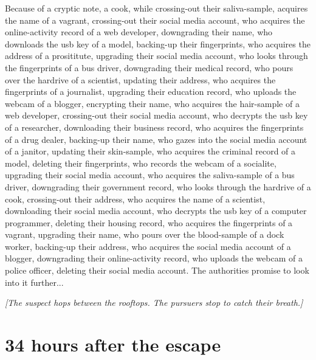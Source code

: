 \documentclass{report}
\begin{document}
Because of a cryptic note, a cook, while crossing-out their saliva-sample, acquires the name of a vagrant, crossing-out their social media account, who acquires the online-activity record of a web developer, downgrading their name, who downloads the usb key of a model, backing-up their fingerprints, who acquires the address of a prosititute, upgrading their social media account, who looks through the fingerprints of a bus driver, downgrading their medical record, who pours over the hardrive of a scientist, updating their address, who acquires the fingerprints of a journalist, upgrading their education record, who uploads the webcam of a blogger, encrypting their name, who acquires the hair-sample of a web developer, crossing-out their social media account, who decrypts the usb key of a researcher, downloading their business record, who acquires the fingerprints of a drug dealer, backing-up their name, who gazes into the social media account of a janitor, updating their skin-sample, who acquires the criminal record of a model, deleting their fingerprints, who records the webcam of a socialite, upgrading their social media account, who acquires the saliva-sample of a bus driver, downgrading their government record, who looks through the hardrive of a cook, crossing-out their address, who acquires the name of a scientist, downloading their social media account, who decrypts the usb key of a computer programmer, deleting their housing record, who acquires the fingerprints of a vagrant, upgrading their name, who pours over the blood-sample of a dock worker, backing-up their address, who acquires the social media account of a blogger, downgrading their online-activity record, who uploads the webcam of a police officer, deleting their social media account. The authorities promise to look into it further...

\textit{[The suspect hops between the rooftops. The pursuers stop to catch their breath.]}


\section*{34 \small{hours after the escape}}
\end{document}
